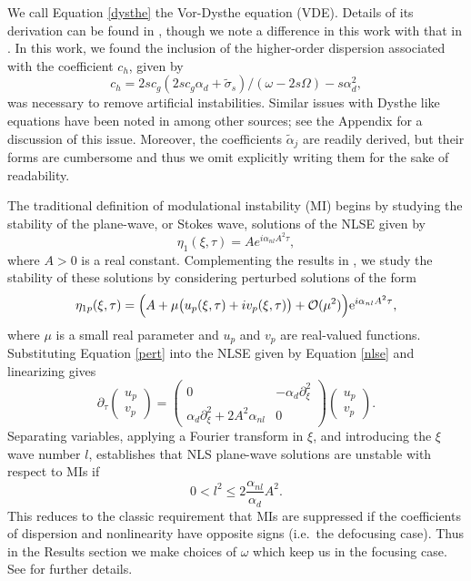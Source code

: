 \documentclass[a4paper,11pt]{article}
\newcommand{\bp}{\begin{pmatrix}}
\newcommand{\ep}{\end{pmatrix}}
\newcommand{\pd}{\partial}
\begin{document}
We call Equation \eqref{dysthe} the Vor-Dysthe equation (VDE).  Details of its derivation can be found in \cite{curtis8}, though we note a difference in this work with that in \cite{curtis8}.  In this work, we found the inclusion of the higher-order dispersion associated with the coefficient $c_{h}$, given by
\[
c_{h} = 2sc_{g}(2sc_{g}\alpha_{d}+\tilde{\sigma}_{s})/(\omega-2s\Omega) - s\alpha_{d}^{2},
\]
was necessary to remove artificial instabilities.  Similar issues with Dysthe like equations have been noted in \cite{eeltink} among other sources; see the Appendix for a discussion of this issue.  Moreover, the coefficients $\tilde{\alpha}_{j}$ are readily derived, but their forms are cumbersome and thus we omit explicitly writing them for the sake of readability.  

The traditional definition of modulational instability (MI) begins by studying the stability of the plane-wave, or Stokes wave, solutions of the NLSE given by
\[
\eta_{1}(\xi,\tau) = A e^{i\alpha_{nl}A^{2}\tau},
\]
where $A>0$ is a real constant.  Complementing the results in \cite{thomas2012nonlinear}, we study the stability of these solutions by considering perturbed solutions of the form
\begin{equation}
\eta_{1p}(\xi,\tau) = \Big{(}A +\mu \big{(}u_{p}(\xi,\tau)+iv_{p}(\xi,\tau)\big{)} +\mathcal{O}(\mu^2)\Big{)}\mbox{e}^{i\alpha_{nl}A^{2}\tau},
\label{pert}
\end{equation}
where $\mu$ is a small real parameter and $u_{p}$ and $v_{p}$ are real-valued functions.  Substituting Equation \eqref{pert} into the NLSE given by Equation \eqref{nlse} and linearizing gives
\[
\pd_{\tau}\bp u_{p}\\ v_{p}\ep = \bp 0 & -\alpha_{d}\pd_{\xi}^{2} \\ \alpha_{d}\pd_{\xi}^{2} + 2A^{2}\alpha_{nl} & 0 \ep \bp u_{p} \\ v_{p} \ep.
\]
Separating variables, applying a Fourier transform in $\xi$, and introducing the $\xi$ wave number $l$, establishes that NLS plane-wave solutions are unstable with respect to MIs if
\[
0 < l^{2} \leq 2\frac{\alpha_{nl}}{\alpha_{d}}A^{2}.
\]
This reduces to the classic requirement that MIs are suppressed if the coefficients of dispersion and nonlinearity have opposite signs (i.e.~the defocusing case).  Thus in the Results section we make choices of $\omega$ which keep us in the focusing case.  See \cite{curtis8} for further details.  
\end{document}
